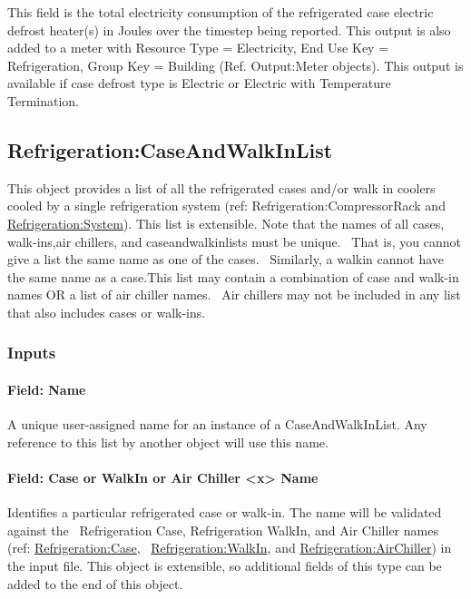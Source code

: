 This field is the total electricity consumption of the refrigerated case electric defrost heater(s) in Joules over the timestep being reported. This output is also added to a meter with Resource Type = Electricity, End Use Key = Refrigeration, Group Key = Building (Ref. Output:Meter objects). This output is available if case defrost type is Electric or Electric with Temperature Termination.

\subsection{Refrigeration:CaseAndWalkInList}\label{refrigerationcaseandwalkinlist}

This object provides a list of all the refrigerated cases and/or walk in coolers cooled by a single refrigeration system (ref: Refrigeration:CompressorRack and \hyperref[refrigerationsystem]{Refrigeration:System}). This list is extensible. Note that the names of all cases, walk-ins,air chillers, and caseandwalkinlists must be unique.~ That is, you cannot give a list the same name as one of the cases.~ Similarly, a walkin cannot have the same name as a case.This list may contain a combination of case and walk-in names OR a list of air chiller names.~ Air chillers may not be included in any list that also includes cases or walk-ins.

\subsubsection{Inputs}\label{inputs-2-033}

\paragraph{Field: Name}\label{field-name-2-032}

A unique user-assigned name for an instance of a CaseAndWalkInList. Any reference to this list by another object will use this name.

\paragraph{Field: Case or WalkIn or Air Chiller \textless{}x\textgreater{} Name}\label{field-case-or-walkin-or-air-chiller-x-name}

Identifies a particular refrigerated case or walk-in. The name will be validated against the~ Refrigeration Case, Refrigeration WalkIn, and Air Chiller names (ref: \hyperref[refrigerationcase]{Refrigeration:Case},~ \hyperref[refrigerationwalkin]{Refrigeration:WalkIn}, and \hyperref[refrigerationairchiller]{Refrigeration:AirChiller}) in the input file. This object is extensible, so additional fields of this type can be added to the end of this object.

